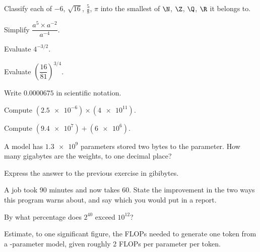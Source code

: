 \begin{testexercises}
\item Classify each of $-6$, $\sqrt{16}$, $\tfrac{5}{8}$, $\pi$ into the
  smallest of $\N$, $\Z$, $\Q$, $\R$ it belongs to.
\item Simplify $\dfrac{a^{5} \times a^{-2}}{a^{-4}}$.
\item Evaluate $4^{-3/2}$.
\item Evaluate $\left(\dfrac{16}{81}\right)^{3/4}$.
\item Write $\num{0.0000675}$ in scientific notation.
\item Compute $(\num{2.5e-6}) \times (\num{4e11})$.
\item Compute $(\num{9.4e7}) + (\num{6e6})$.
\item A model has $\num{1.3e9}$ parameters stored two bytes to the parameter.
  How many gigabytes are the weights, to one decimal place?
\item Express the answer to the previous exercise in gibibytes.
\item A job took 90 minutes and now takes 60. State the improvement in the two
  ways this program warns about, and say which you would put in a report.
\item By what percentage does $2^{40}$ exceed $10^{12}$?
\item Estimate, to one significant figure, the FLOPs needed to generate one
  token from a -parameter model, given roughly 2 FLOPs per
  parameter per token.
\end{testexercises}

